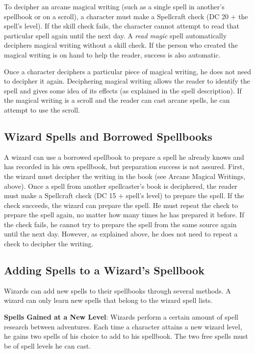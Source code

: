 To decipher an arcane magical writing (such as a single spell in another's spellbook or on a scroll), a character must make a Spellcraft check (DC 20 + the spell's level). If the skill check fails, the character cannot attempt to read that particular spell again until the next day. A \textit{read magic }spell automatically deciphers magical writing without a skill check. If the person who created the magical writing is on hand to help the reader, success is also automatic.
				
Once a character deciphers a particular piece of magical writing, he does not need to decipher it again. Deciphering magical writing allows the reader to identify the spell and gives some idea of its effects (as explained in the spell description). If the magical writing is a scroll and the reader can cast arcane spells, he can attempt to use the scroll.
				
\subsection{Wizard Spells and Borrowed Spellbooks}

				
A wizard can use a borrowed spellbook to prepare a spell he already knows and has recorded in his own spellbook, but preparation success is not assured. First, the wizard must decipher the writing in the book (see Arcane Magical Writings, above). Once a spell from another spellcaster's book is deciphered, the reader must make a Spellcraft check (DC 15 + spell's level) to prepare the spell. If the check succeeds, the wizard can prepare the spell. He must repeat the check to prepare the spell again, no matter how many times he has prepared it before. If the check fails, he cannot try to prepare the spell from the same source again until the next day. However, as explained above, he does not need to repeat a check to decipher the writing.
				
\subsection{Adding Spells to a Wizard's Spellbook}

				
Wizards can add new spells to their spellbooks through several methods. A wizard can only learn new spells that belong to the wizard spell lists.
				
\textbf{Spells Gained at a New Level}: Wizards perform a certain amount of spell research between adventures. Each time a character attains a new wizard level, he gains two spells of his choice to add to his spellbook. The two free spells must be of spell levels he can cast.
				
